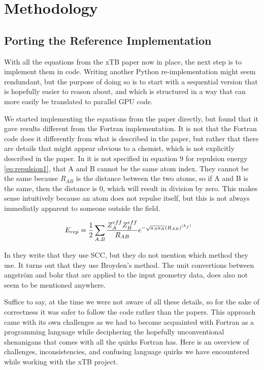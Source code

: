 \chapter{Methodology}

\section{Porting the Reference Implementation}

With all the equations from the xTB paper now in place, the next step is to implement them in code. Writing another Python re-implementation might seem rendundant, but the purpose of doing so is to start with a sequential version that is hopefully easier to reason about, and which is structured in a way that can more easily be translated to parallel GPU code.

We started implementing the equations from the paper directly, but found that it gave results different from the Fortran implementation. It is not that the Fortran code does it differently from what is described in the paper, but rather that there are details that might appear obvious to a chemist, which is not explicitly described in the paper. In \cite{bannwarth2019} it is not specified in equation $9$ for repulsion energy \eqref{eq:repulsion1}, that A and B cannot be the same atom index. They cannot be the same because $R_{AB}$ is the distance between the two atoms, so if A and B is the same, then the distance is $0$, which will result in division by zero. This makes sense intuitively because an atom does not repulse itself, but this is not always immediatly apparent to someone outside the field.

\begin{align}
  \E{rep} &= \frac{1}{2}\sum_{A,B}\frac{Z^{eff}_A Z^{eff}_B}{R_{AB}}e^{-\sqrt{a_Aa_B}(R_{AB})^{(k_f)}} \label{eq:repulsion1}
\end{align}



In \cite{grimme2017} they write that they use SCC, but they do not mention which method they use. It turns out that they use Broyden's method. The unit convertions between angström and bohr that are applied to the input geometry data, does also not seem to be mentioned anywhere.

Suffice to say, at the time we were not aware of all these details, so for the sake of correctness it was safer to follow the code rather than the papers. This approach came with its own challenges as we had to become acquainted with Fortran as a programming language while deciphering the hopefully unconventional shenanigans that comes with all the quirks Fortran has.
Here is an overview of challenges, inconsistencies, and confusing language quirks we have encountered while working with the xTB project.

